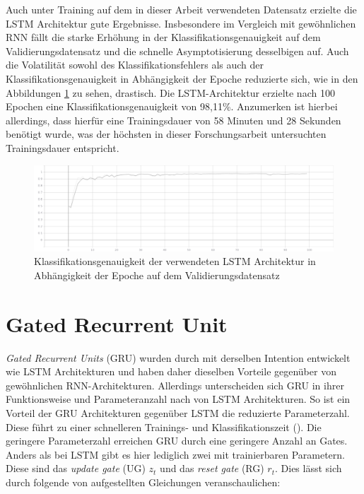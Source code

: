 Auch unter Training auf dem in dieser Arbeit verwendeten Datensatz erzielte die LSTM Architektur gute Ergebnisse. Insbesondere im Vergleich mit gewöhnlichen RNN fällt die starke Erhöhung in der Klassifikationsgenauigkeit auf dem Validierungsdatensatz und die schnelle Asymptotisierung desselbigen auf. Auch die Volatilität sowohl des Klassifikationsfehlers als auch der Klassifikationsgenauigkeit in Abhängigkeit der Epoche reduzierte sich, wie in den Abbildungen \ref{lstm-acc} zu sehen, drastisch. Die LSTM-Architektur erzielte nach 100 Epochen eine Klassifikationsgenauigkeit von 98,11\%. Anzumerken ist hierbei allerdings, dass hierfür eine Trainingsdauer von 58 Minuten und 28 Sekunden benötigt wurde, was der höchsten in dieser Forschungsarbeit untersuchten Trainingsdauer entspricht.

\begin{figure}[h]
    \centering
    \includegraphics[scale=0.3]{grafiken/lstm-acc.png}
    \caption{Klassifikationsgenauigkeit der verwendeten LSTM Architektur in Abhängigkeit der Epoche auf dem Validierungsdatensatz}
    \label{lstm-acc}
\end{figure}


\section{Gated Recurrent Unit}
\label{sec:gru}

\textit{Gated Recurrent Units} (GRU) wurden durch \cite{cho-etal-2014-learning} mit derselben Intention entwickelt wie LSTM Architekturen und haben daher dieselben Vorteile gegenüber von gewöhnlichen RNN-Architekturen. Allerdings unterscheiden sich GRU in ihrer Funktionsweise und Parameteranzahl nach \cite{simao2019emg} von LSTM Architekturen. So ist ein Vorteil der GRU Architekturen gegenüber LSTM die reduzierte Parameterzahl. Diese führt zu einer schnelleren Trainings- und Klassifikationszeit (\cite{simao2019emg}). Die geringere Parameterzahl erreichen GRU durch eine geringere Anzahl an Gates. Anders als bei LSTM gibt es hier lediglich zwei mit trainierbaren Parametern. Diese sind das \textit{update gate} (UG) $z_t$ und das \textit{reset gate} (RG) $r_t$. Dies lässt sich durch folgende von \cite{simao2019emg} aufgestellten Gleichungen veranschaulichen:

